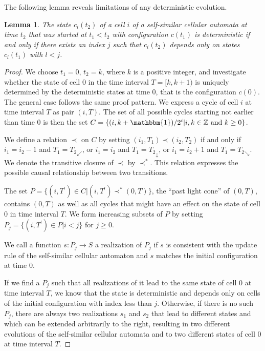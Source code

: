 \documentclass{article}
\newtheorem{lemma}{Lemma}
\theoremstyle{definition}
\begin{document}
The following lemma reveals limitations of any deterministic evolution.
\begin{lemma}
\label{prop:det}
The state $c_i(t_2)$ of a cell $i$ of a self-similar cellular automata at time $t_2$ 
that was started at $t_1 < t_2$ with configuration $c(t_1)$ is deterministic if and only if
there exists an index $j$ such that $c_i(t_2)$ depends only on states $c_l(t_1)$ with $l < j$.
\end{lemma}
\begin{proof}
We choose $t_1 = 0$, $t_2 = k$, where $k$ is a positive integer, and investigate
whether the state of cell $0$ in the time interval $T=[k,k+1)$ is uniquely determined
by the deterministic states at time 0, that is the configuration $c(0)$.
The general case follows the same proof pattern.
We express a cycle of cell $i$ at time interval $T$ as pair $(i, T)$.
The set of all possible cycles starting not earlier than time $0$ is then
the set $C = \{(i,k + \mathbbm{1})/ 2^{i}| i,k \in \mathbb{Z} \mbox{ and } k \geq 0\}$.

We define a relation $\prec$ on $C$ by setting $(i_1, T_1) \prec (i_2, T_2)$ if and only if
$i_1 = i_2 - 1$ and $T_1 = {T_2}_\swarrow$, or $i_1 = i_2$ and $T_1 = {T_2}_\downarrow$, or $i_1 = i_2 + 1$ and $T_1 = {T_2}_\searrow$.
We denote the transitive closure of $\prec$ by  $\prec^*$.
This relation expresses the possible causal relationship between two transitions.

The set $P = \{(i,T^\prime) \in C| (i,T^\prime) \prec^* (0,T) \}$, the ``past light cone'' of $(0,T)$, contains $(0,T)$ as well as all cycles that
might have an effect on the state of cell $0$ in time interval $T$.
We form increasing subsets of $P$ by setting $P_j = \{(i,T^\prime) \in P| i < j\}$ for $j \geq 0$.

We call a function $s: P_j \rightarrow S$ a realization of $P_j$ if $s$ is consistent with the update rule of the self-similar
cellular automaton and $s$ matches the initial configuration at time $0$.

If we find a $P_j$ such that all realizations of it lead to the same state of cell $0$ at time interval $T$,
we know that the state is deterministic and depends only on cells of the initial configuration with index less than $j$.
Otherwise, if there is no such $P_j$, there are always two realizations $s_1$ and $s_2$ that lead to different states and which can be extended
arbitrarily to the right, resulting in two different evolutions of the self-similar cellular automata and to two different
states of cell $0$ at time interval $T$.
\end{proof}
\end{document}
